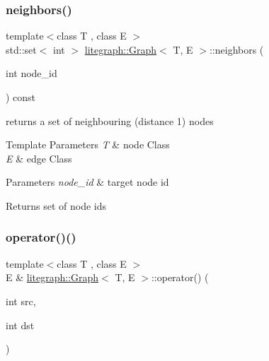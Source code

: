 \subsubsection{\texorpdfstring{neighbors()}{neighbors()}}
{\footnotesize\ttfamily template$<$class T , class E $>$ \\
std\+::set$<$ int $>$ \hyperlink{classlitegraph_1_1Graph}{litegraph\+::\+Graph}$<$ T, E $>$\+::neighbors (\begin{DoxyParamCaption}\item[{int}]{node\+\_\+id }\end{DoxyParamCaption}) const}



returns a set of neighbouring (distance 1) nodes 


\begin{DoxyTemplParams}{Template Parameters}
{\em T} & node Class \\
\hline
{\em E} & edge Class \\
\hline
\end{DoxyTemplParams}

\begin{DoxyParams}{Parameters}
{\em node\+\_\+id} & target node id\\
\hline
\end{DoxyParams}
\begin{DoxyReturn}{Returns}
set of node ids 
\end{DoxyReturn}
\mbox{\label{classlitegraph_1_1Graph_aa7009938b623c493b2017c3cea97574e}} 
\subsubsection{\texorpdfstring{operator()()}{operator()()}\hspace{0.1cm}{\footnotesize\ttfamily [1/2]}}
{\footnotesize\ttfamily template$<$class T , class E $>$ \\
E \& \hyperlink{classlitegraph_1_1Graph}{litegraph\+::\+Graph}$<$ T, E $>$\+::operator() (\begin{DoxyParamCaption}\item[{int}]{src,  }\item[{int}]{dst }\end{DoxyParamCaption})}



